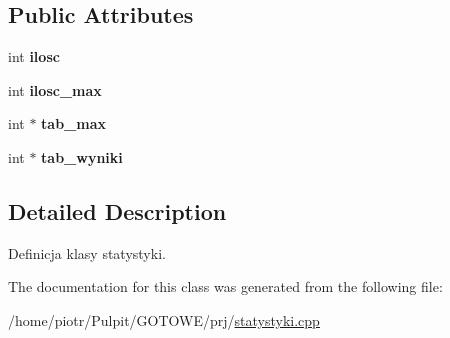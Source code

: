 \subsection*{\-Public \-Attributes}
\begin{DoxyCompactItemize}
\item 
\hypertarget{classstatystyki_a786c8ec7188475198f1673f893e6f6cd}{int {\bfseries ilosc}}\label{classstatystyki_a786c8ec7188475198f1673f893e6f6cd}

\item 
\hypertarget{classstatystyki_ad3738a65e663945949a3ac4153606146}{int {\bfseries ilosc\-\_\-max}}\label{classstatystyki_ad3738a65e663945949a3ac4153606146}

\item 
\hypertarget{classstatystyki_a63b3b1686232799ae4ec8a579bd98611}{int $\ast$ {\bfseries tab\-\_\-max}}\label{classstatystyki_a63b3b1686232799ae4ec8a579bd98611}

\item 
\hypertarget{classstatystyki_a92ed8044de8f830cdb18fef80efa8608}{int $\ast$ {\bfseries tab\-\_\-wyniki}}\label{classstatystyki_a92ed8044de8f830cdb18fef80efa8608}

\end{DoxyCompactItemize}


\subsection{\-Detailed \-Description}
\-Definicja klasy statystyki. 



\-The documentation for this class was generated from the following file\-:\begin{DoxyCompactItemize}
\item 
/home/piotr/\-Pulpit/\-G\-O\-T\-O\-W\-E/prj/\hyperlink{statystyki_8cpp}{statystyki.\-cpp}\end{DoxyCompactItemize}
